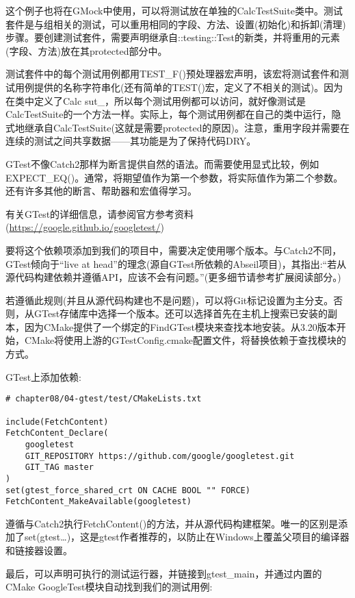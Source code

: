 这个例子也将在GMock中使用，可以将测试放在单独的CalcTestSuite类中。测试套件是与组相关的测试，可以重用相同的字段、方法、设置(初始化)和拆卸(清理)步骤。要创建测试套件，需要声明继承自::testing::Test的新类，并将重用的元素(字段、方法)放在其protected部分中。

测试套件中的每个测试用例都用TEST\_F()预处理器宏声明，该宏将测试套件和测试用例提供的名称字符串化(还有简单的TEST()宏，定义了不相关的测试)。因为在类中定义了Calc sut\_，所以每个测试用例都可以访问，就好像测试是CalcTestSuite的一个方法一样。实际上，每个测试用例都在自己的类中运行，隐式地继承自CalcTestSuite(这就是需要protected的原因)。注意，重用字段并需要在连续的测试之间共享数据——其功能是为了保持代码DRY。

GTest不像Catch2那样为断言提供自然的语法。而需要使用显式比较，例如EXPECT\_EQ()。通常，将期望值作为第一个参数，将实际值作为第二个参数。还有许多其他的断言、帮助器和宏值得学习。

\begin{tcolorbox}[colback=blue!5!white,colframe=blue!75!black,title=Note]
有关GTest的详细信息，请参阅官方参考资料(\url{https://google.github.io/googletest/})
\end{tcolorbox}

要将这个依赖项添加到我们的项目中，需要决定使用哪个版本。与Catch2不同，GTest倾向于“live at head”的理念(源自GTest所依赖的Abseil项目)，其指出:“若从源代码构建依赖并遵循API，应该不会有问题。”(更多细节请参考扩展阅读部分。)

若遵循此规则(并且从源代码构建也不是问题)，可以将Git标记设置为主分支。否则，从GTest存储库中选择一个版本。还可以选择首先在主机上搜索已安装的副本，因为CMake提供了一个绑定的FindGTest模块来查找本地安装。从3.20版本开始，CMake将使用上游的GTestConfig.cmake配置文件，将替换依赖于查找模块的方式。

GTest上添加依赖:

\begin{lstlisting}[style=styleCMake]
# chapter08/04-gtest/test/CMakeLists.txt

include(FetchContent)
FetchContent_Declare(
	googletest
	GIT_REPOSITORY https://github.com/google/googletest.git
	GIT_TAG master
)
set(gtest_force_shared_crt ON CACHE BOOL "" FORCE)
FetchContent_MakeAvailable(googletest)
\end{lstlisting}

遵循与Catch2执行FetchContent()的方法，并从源代码构建框架。唯一的区别是添加了set(gtest…)，这是gtest作者推荐的，以防止在Windows上覆盖父项目的编译器和链接器设置。

最后，可以声明可执行的测试运行器，并链接到gtest\_main，并通过内置的CMake GoogleTest模块自动找到我们的测试用例:

